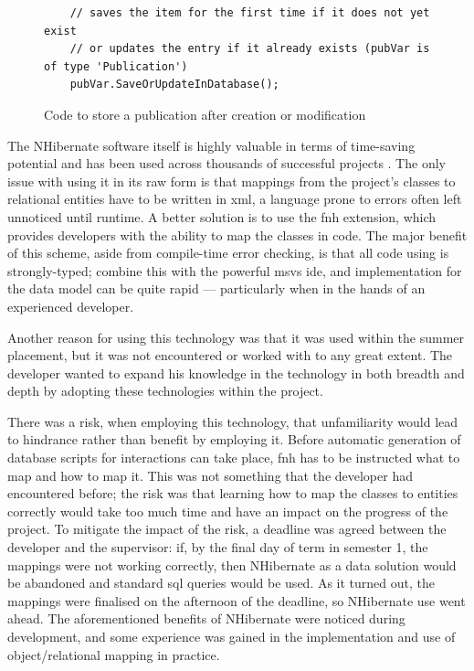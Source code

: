 \begin{figure}
	\begin{center}
			\lstset{language=CSharp} 
			\begin{lstlisting}
	// saves the item for the first time if it does not yet exist
	// or updates the entry if it already exists (pubVar is of type 'Publication')
	pubVar.SaveOrUpdateInDatabase();
			\end{lstlisting}
		\caption{Code to store a publication after creation or modification}
		\label{fig:storePublication}
	\end{center}
\end{figure}

The NHibernate software itself is highly valuable in terms of time-saving potential and has been used across thousands of successful projects \cite{NhUse}.  The only issue with using it in its raw form is that mappings from the project's classes to relational entities have to be written in \gls{xml}, a language prone to errors often left unnoticed until runtime.  A better solution is to use the \gls{fnh} extension, which provides developers with the ability to map the classes in code.  The major benefit of this scheme, aside from compile-time error checking, is that all code using is strongly-typed; combine this with the powerful \gls{msvs} \gls{ide}, and implementation for the data model can be quite rapid --- particularly when in the hands of an experienced developer.

Another reason for using this technology was that it was used within the summer placement, but it was not encountered or worked with to any great extent.  The developer wanted to expand his knowledge in the technology in both breadth and depth by adopting these technologies within the project.

There was a risk, when employing this technology, that unfamiliarity would lead to hindrance rather than benefit by employing it.  Before automatic generation of database scripts for interactions can take place, \gls{fnh} has to be instructed what to map and how to map it.  This was not something that the developer had encountered before; the risk was that learning how to map the classes to entities correctly would take too much time and have an impact on the progress of the project.  To mitigate the impact of the risk, a deadline was agreed between the developer and the supervisor: if, by the final day of term in semester 1, the mappings were not working correctly, then NHibernate as a data solution would be abandoned and standard \gls{sql} queries would be used.  As it turned out, the mappings were finalised on the afternoon of the deadline, so NHibernate use went ahead.  The aforementioned benefits of NHibernate were noticed during development, and some experience was gained in the implementation and use of object/relational mapping in practice.

